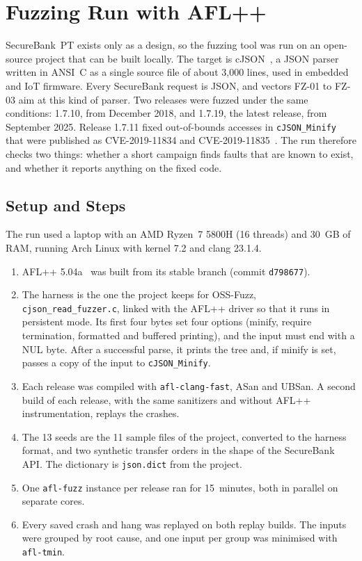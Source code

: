 \section{Fuzzing Run with AFL++}
\label{sec:fuzzrun}

SecureBank~PT exists only as a design, so the fuzzing tool was run on an
open-source project that can be built locally. The target is
cJSON~\cite{cjson}, a JSON parser written in ANSI~C as a single source
file of about 3{,}000 lines, used in embedded and IoT firmware. Every
SecureBank request is JSON, and vectors FZ-01 to FZ-03 aim at this kind
of parser. Two releases were fuzzed under the same conditions: 1.7.10,
from December 2018, and 1.7.19, the latest release, from September 2025.
Release 1.7.11 fixed out-of-bounds accesses in \texttt{cJSON\_Minify}
that were published as CVE-2019-11834 and
CVE-2019-11835~\cite{cve201911834}. The run therefore checks two things:
whether a short campaign finds faults that are known to exist, and
whether it reports anything on the fixed code.

\subsection{Setup and Steps}

The run used a laptop with an AMD Ryzen~7 5800H (16 threads) and 30~GB
of RAM, running Arch Linux with kernel 7.2 and clang 23.1.4.

\begin{enumerate}
\item AFL++ 5.04a~\cite{aflpp2020} was built from its stable branch
(commit \texttt{d798677}).
\item The harness is the one the project keeps for OSS-Fuzz,
\texttt{cjson\_read\_fuzzer.c}, linked with the AFL++ driver so that it
runs in persistent mode. Its first four bytes set four options (minify,
require termination, formatted and buffered printing), and the input
must end with a NUL byte. After a successful parse, it prints the tree
and, if minify is set, passes a copy of the input to
\texttt{cJSON\_Minify}.
\item Each release was compiled with \texttt{afl-clang-fast},
\ac{ASan} and \ac{UBSan}. A second build of each release, with the same
sanitizers and without AFL++ instrumentation, replays the crashes.
\item The 13 seeds are the 11 sample files of the project, converted to
the harness format, and two synthetic transfer orders in the shape of
the SecureBank \ac{API}. The dictionary is \texttt{json.dict} from the
project.
\item One \texttt{afl-fuzz} instance per release ran for 15~minutes, both
in parallel on separate cores.
\item Every saved crash and hang was replayed on both replay builds. The
inputs were grouped by root cause, and one input per group was minimised
with \texttt{afl-tmin}.
\end{enumerate}

